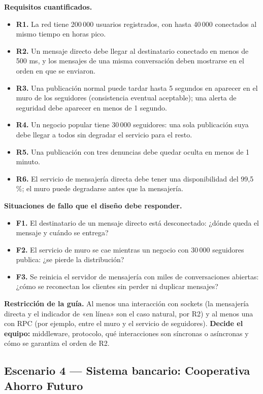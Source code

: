 \documentclass[10pt]{article}
\begin{document}
\textbf{Requisitos cuantificados.}
\begin{itemize}[leftmargin=1.6em]
	\item \textbf{R1.} La red tiene 200\,000 usuarios registrados, con hasta 40\,000 conectados al mismo tiempo en horas pico.
	\item \textbf{R2.} Un mensaje directo debe llegar al destinatario conectado en menos de 500 ms, y los mensajes de una misma conversación deben mostrarse en el orden en que se enviaron.
	\item \textbf{R3.} Una publicación normal puede tardar hasta 5 segundos en aparecer en el muro de los seguidores (consistencia eventual aceptable); una alerta de seguridad debe aparecer en menos de 1 segundo.
	\item \textbf{R4.} Un negocio popular tiene 30\,000 seguidores: una sola publicación suya debe llegar a todos sin degradar el servicio para el resto.
	\item \textbf{R5.} Una publicación con tres denuncias debe quedar oculta en menos de 1 minuto.
	\item \textbf{R6.} El servicio de mensajería directa debe tener una disponibilidad del 99,5\,\%; el muro puede degradarse antes que la mensajería.
\end{itemize}

\textbf{Situaciones de fallo que el diseño debe responder.}
\begin{itemize}[leftmargin=1.6em]
	\item \textbf{F1.} El destinatario de un mensaje directo está desconectado: ¿dónde queda el mensaje y cuándo se entrega?
	\item \textbf{F2.} El servicio de muro se cae mientras un negocio con 30\,000 seguidores publica: ¿se pierde la distribución?
	\item \textbf{F3.} Se reinicia el servidor de mensajería con miles de conversaciones abiertas: ¿cómo se reconectan los clientes sin perder ni duplicar mensajes?
\end{itemize}

\textbf{Restricción de la guía.} Al menos una interacción con sockets (la mensajería directa y el indicador de «en línea» son el caso natural, por R2) y al menos una con RPC (por ejemplo, entre el muro y el servicio de seguidores). \textbf{Decide el equipo:} middleware, protocolo, qué interacciones son síncronas o asíncronas y cómo se garantiza el orden de R2.

\subsection{Escenario 4 --- Sistema bancario: Cooperativa Ahorro Futuro}
\end{document}

